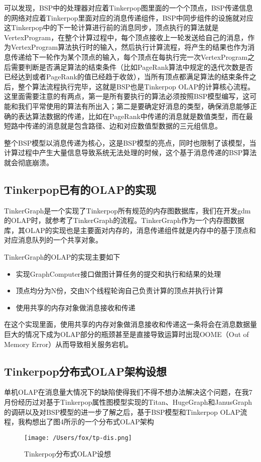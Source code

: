 \documentclass{article}
\begin{document}
可以发现，BSP中的处理器对应着Tinkerpop图里面的一个个顶点，BSP传递信息的网络对应着Tinkerpop里面对应的消息传递组件，BSP中同步组件的设施就对应这Tinkerpop中的下一轮计算进行前的消息同步，顶点执行的算法就是VertexProgram，在整个计算过程中，每个顶点接收上一轮发送给自己的消息，作为VertexProgram算法执行时的输入，然后执行计算流程，将产生的结果也作为消息传递给下一轮作为某个顶点的输入，每个顶点在每执行完一次VertexProgram之后需要判断是否满足算法的结束条件（比如PageRank算法中规定的迭代次数是否已经达到或者PageRank的值已经趋于收敛），当所有顶点都满足算法的结束条件之后，整个算法流程执行完毕，这就是BSP也是Tinkerpop OLAP的计算核心流程。这里面需要注意的有两点，第一是所有要执行的算法必须按照BSP模型编写，这可能和我们平常使用的算法有所出入；第二是要确定好消息的类型，确保消息能够正确的表达算法数据的传递，比如在PageRank中传递的消息就是数值类型，而在最短路中传递的消息就是包含路径、边和对应数值型数据的三元组信息。

整个BSP模型以消息传递为核心，这是BSP模型的亮点，同时也限制了该模型，当计算过程中产生大量信息导致系统无法处理的时候，这个基于消息传递的BSP算法就会彻底崩溃。

\subsection{Tinkerpop已有的OLAP的实现}
TinkerGraph是一个实现了Tinkerpop所有规范的内存图数据库，我们在开发gdm的OLAP时，就参考了TinkerGraph的流程。TinkerGraph作为一个内存图数据库，其OLAP的实现也是主要面对内存的，消息传递组件就是内存中的基于顶点和对应消息队列的一个共享对象。

TinkerGraph的OLAP的实现主要如下

\begin{itemize}
\item 实现GraphComputer接口做图计算任务的提交和执行和结果的处理
\item 顶点均分为N份，交由N个线程轮询自己负责计算的顶点并执行计算
\item 使用共享的内存对象做消息接收和传递
\end{itemize}

在这个实现里面，使用共享的内存对象做消息接收和传递这一条将会在消息数据量巨大的情况下成为OLAP部分的瓶颈甚至是直接导致运算时出现OOME（Out of Memory Error）从而导致相关服务宕机。

\subsection{Tinkerpop分布式OLAP架构设想}

单机OLAP在消息量大情况下的缺陷使得我们不得不想办法解决这个问题，在我7月份经历过对基于Tinkerpop属性图模型实现的Titan、HugeGraph和JanusGraph的调研以及对BSP模型的进一步了解之后，基于BSP模型和Tinkerpop OLAP流程，我构想出了图4所示的一个分布式OLAP架构
\begin{figure*}
    \centering
        \texttt{[image: /Users/fox/tp-dis.png]}
        \caption{Tinkerpop分布式OLAP设想}
\end{figure*}
\end{document}
